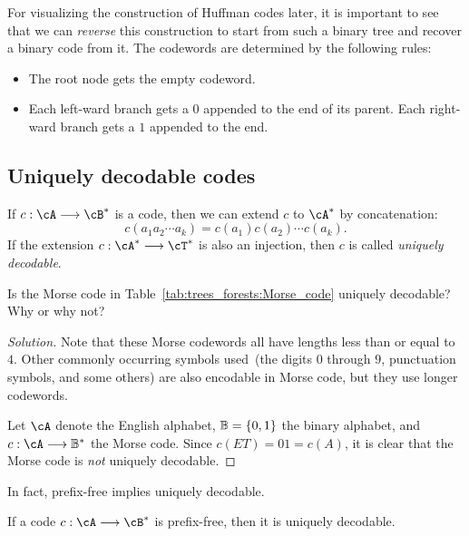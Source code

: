 For visualizing the construction of Huffman codes
later, it is important to see that we can \emph{reverse} this
construction to start from such a binary tree and
recover a binary code from it. The codewords are
determined by the following rules:
\begin{itemize}
\item The root node gets the empty codeword.

\item Each left-ward branch gets a $0$ appended to the end of its
  parent. Each right-ward branch gets a $1$ appended to the end.
\end{itemize}



\subsection{Uniquely decodable codes}

If $c: \cA \to \cB^*$ is a code, then we can extend $c$ to $\cA^*$ by
concatenation:
\[
c(a_1 a_2 \cdots a_k)
=
c(a_1) c(a_2) \cdots c(a_k).
\]
If the extension $c: \cA^* \to \cT^*$ is also an injection, then $c$
is called \emph{uniquely decodable}.

\begin{example}
Is the Morse code in
Table~\ref{tab:trees_forests:Morse_code} uniquely decodable? Why or
why not?
\end{example}

\begin{proof}[Solution]
Note that these Morse codewords all have lengths less than or equal to
$4$. Other commonly occurring symbols used~(the digits $0$ through
$9$, punctuation symbols, and some others) are also encodable in Morse
code, but they use longer codewords.

Let $\cA$ denote the English alphabet, $\mathbb{B} = \{0, 1\}$ the
binary alphabet, and $c: \cA \to \B^*$ the
Morse code. Since $c(ET) = 01 = c(A)$, it is clear
that the Morse code is \emph{not} uniquely decodable.
\end{proof}

In fact, prefix-free implies uniquely decodable.

\begin{theorem}
If a code $c: \cA \to \cB^*$ is prefix-free, then it is uniquely
decodable.
\end{theorem}

